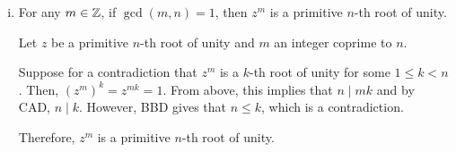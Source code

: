 \documentclass[tikz]{agony}
\begin{document}
\begin{enumerate}[(a)]
\begin{enumerate}[i.]
\begin{proof}
                  If $r=0$, then $j = qn$ and $j \mid n$.
                  Otherwise, we have $1 \leq r \leq n-1$ and $z^r = 1$, which is a contradiction
                  to the fact that $z$ is a primitive $n$-th root of unity.

                  Therefore, $r = 0$ and $j \mid n$.

                  ($\Larr$) If $n \mid j$ and $j = nk$ for an integer $k$,
                  then $z^j = z^{nk} = (z^n)^k = 1^k = 1$.
                \end{proof}
          \item For any $m\in\mathbb{Z}$, if $\gcd(m,n)=1$, then $z^m$ is a primitive $n$-th root of unity.
                \begin{prf}
                  Let $z$ be a primitive $n$-th root of unity and $m$ an integer coprime to $n$.
                  
                  Suppose for a contradiction that $z^m$ is a $k$-th root of unity for some $1 \leq k < n$.
                  Then, $(z^m)^k = z^{mk} = 1$.
                  From above, this implies that $n \mid mk$ and by CAD, $n \mid k$.
                  However, BBD gives that $n \leq k$, which is a contradiction.

                  Therefore, $z^m$ is a primitive $n$-th root of unity.
                \end{prf}
        \end{enumerate}
\end{enumerate}
\end{document}
